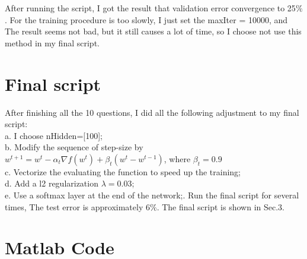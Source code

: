 \documentclass[12pt]{article}
\begin{document}
After running the script, I got the result that validation error convergence to 25$\%$. For the training procedure is too slowly, I just set the maxIter = 10000, and The result seems not bad, but it still causes a lot of time, so I choose not use this method  in my final script.

\section{Final script}
After finishing all the 10 questions, I did all the following adjustment to my final script:\\
a. I choose nHidden=[100];\\
b. Modify the sequence of step-size by  $w^{t+1} = w^t -\alpha_t\nabla f(w^t) + \beta_t(w^t - w^{t-1})$, where $\beta_t = 0.9$\\
c. Vectorize the evaluating the function to speed up the training;\\
d. Add a l2 regularization $\lambda = 0.03$;\\
e. Use a softmax layer at the end of the network;.
Run the final script for several times, The test error is approximately 6$\%$.
The final script is shown in Sec.3.
\section{Matlab Code}
\end{document}
